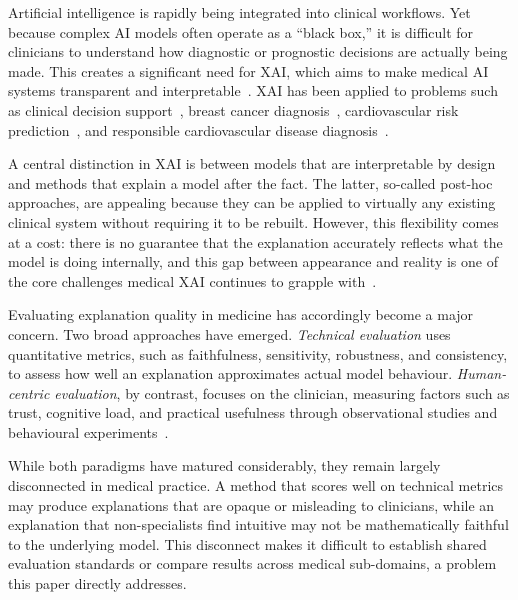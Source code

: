 Artificial intelligence is rapidly being integrated into clinical workflows.
Yet because complex AI models often operate as a ``black box,'' it is difficult
for clinicians to understand how diagnostic or prognostic decisions are actually
being made. This creates a significant need for XAI, which aims to make medical
AI systems transparent and interpretable~\cite{Tjoa2021MedicalXAI}. XAI has been applied to problems such
as clinical decision support~\cite{abbas2025explainable}, breast cancer
diagnosis~\cite{saharan2025explainable}, cardiovascular risk
prediction~\cite{shah2025explainable}, and responsible cardiovascular disease diagnosis~\cite{muneer2025blockchain}.

A central distinction in XAI is between models that are interpretable by
design and methods that explain a model after the fact. The latter,
so-called post-hoc approaches, are appealing because they can be applied to
virtually any existing clinical system without requiring it to be rebuilt.
However, this flexibility comes at a cost: there is no guarantee that the
explanation accurately reflects what the model is doing internally, and this
gap between appearance and reality is one of the core challenges medical XAI
continues to grapple with~\cite{holzinger2022information,palatnik2021xai}.

Evaluating explanation quality in medicine has accordingly become a major
concern. Two broad approaches have emerged. \emph{Technical evaluation} uses
quantitative metrics, such as faithfulness, sensitivity, robustness, and
consistency, to assess how well an explanation approximates actual model
behaviour. \emph{Human-centric evaluation}, by contrast, focuses on the
clinician, measuring factors such as trust, cognitive load, and practical
usefulness through observational studies and behavioural experiments~\cite{lenis2020domain}.

While both paradigms have matured considerably, they remain largely
disconnected in medical practice. A method that scores well on technical
metrics may produce explanations that are opaque or misleading to clinicians,
while an explanation that non-specialists find intuitive may not be
mathematically faithful to the underlying model. This disconnect makes it
difficult to establish shared evaluation standards or compare results across
medical sub-domains, a problem this paper directly addresses.

